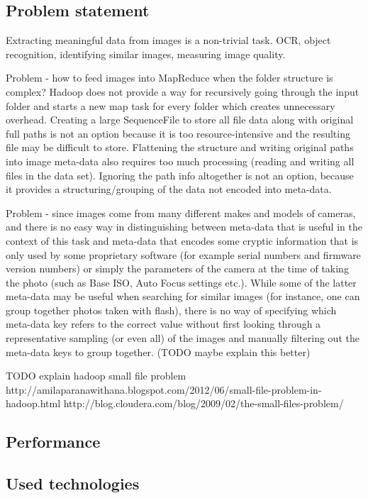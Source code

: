 \documentclass [12pt,a4paper]{report}
\begin{document}
\subsection{Problem statement}

Extracting meaningful data from images is a non-trivial task. OCR, object recognition, identifying similar images, measuring image quality.

Problem - how to feed images into MapReduce when the folder structure is complex? Hadoop does not provide a way for recursively going through the input folder and starts a new map task for every folder which creates unnecessary overhead. Creating a large SequenceFile to store all file data along with original full paths is not an option because it is too resource-intensive and the resulting file may be difficult to store. Flattening the structure and writing original paths into image meta-data also requires too much processing (reading and writing all files in the data set). Ignoring the path info altogether is not an option, because it provides a structuring/grouping of the data not encoded into meta-data.

Problem - since images come from many different makes and models of cameras, and there is no easy way in distinguishing between meta-data that is useful in the context of this task and meta-data that encodes some cryptic information that is only used by some proprietary software (for example serial numbers and firmware version numbers) or simply the parameters of the camera at the time of taking the photo (such as Base ISO, Auto Focus settings etc.). While some of the latter meta-data may be useful when searching for similar images (for instance, one can group together photos taken with flash), there is no way of specifying which meta-data key refers to the correct value without first looking through a representative sampling (or even all) of the images and manually filtering out the meta-data keys to group together. (TODO maybe explain this better)

TODO explain hadoop small file problem
http://amilaparanawithana.blogspot.com/2012/06/small-file-problem-in-hadoop.html
http://blog.cloudera.com/blog/2009/02/the-small-files-problem/

\subsection{Performance}

\subsection{Used technologies}
\end{document}
